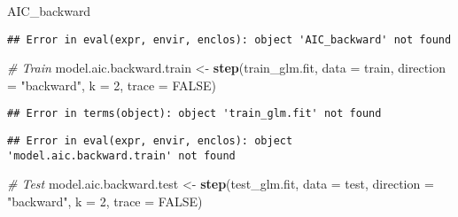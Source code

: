 \documentclass[]{article}
\newenvironment{Shaded}{\begin{snugshade}}{\end{snugshade}}
\newcommand{\CommentTok}[1]{\textcolor[rgb]{0.56,0.35,0.01}{\textit{#1}}}
\newcommand{\DataTypeTok}[1]{\textcolor[rgb]{0.13,0.29,0.53}{#1}}
\newcommand{\DecValTok}[1]{\textcolor[rgb]{0.00,0.00,0.81}{#1}}
\newcommand{\KeywordTok}[1]{\textcolor[rgb]{0.13,0.29,0.53}{\textbf{#1}}}
\newcommand{\NormalTok}[1]{#1}
\newcommand{\OperatorTok}[1]{\textcolor[rgb]{0.81,0.36,0.00}{\textbf{#1}}}
\newcommand{\OtherTok}[1]{\textcolor[rgb]{0.56,0.35,0.01}{#1}}
\newcommand{\StringTok}[1]{\textcolor[rgb]{0.31,0.60,0.02}{#1}}
\begin{document}
\begin{Shaded}
\begin{Highlighting}[]
\NormalTok{AIC_backward}
\end{Highlighting}
\end{Shaded}

\begin{verbatim}
## Error in eval(expr, envir, enclos): object 'AIC_backward' not found
\end{verbatim}

\begin{Shaded}
\begin{Highlighting}[]
\CommentTok{# Train}
\NormalTok{model.aic.backward.train <-}\StringTok{ }\KeywordTok{step}\NormalTok{(train_glm.fit,  }\DataTypeTok{data =}\NormalTok{ train, }\DataTypeTok{direction =} \StringTok{"backward"}\NormalTok{, }\DataTypeTok{k =} \DecValTok{2}\NormalTok{, }\DataTypeTok{trace =} \OtherTok{FALSE}\NormalTok{)}
\end{Highlighting}
\end{Shaded}

\begin{verbatim}
## Error in terms(object): object 'train_glm.fit' not found
\end{verbatim}

\begin{Shaded}
\end{Shaded}

\begin{verbatim}
## Error in eval(expr, envir, enclos): object 'model.aic.backward.train' not found
\end{verbatim}

\begin{Shaded}
\begin{Highlighting}[]
\CommentTok{# Test}
\NormalTok{model.aic.backward.test <-}\StringTok{ }\KeywordTok{step}\NormalTok{(test_glm.fit,  }\DataTypeTok{data =}\NormalTok{ test, }\DataTypeTok{direction =} \StringTok{"backward"}\NormalTok{, }\DataTypeTok{k =} \DecValTok{2}\NormalTok{, }\DataTypeTok{trace =} \OtherTok{FALSE}\NormalTok{)}
\end{Highlighting}
\end{Shaded}
\end{document}
